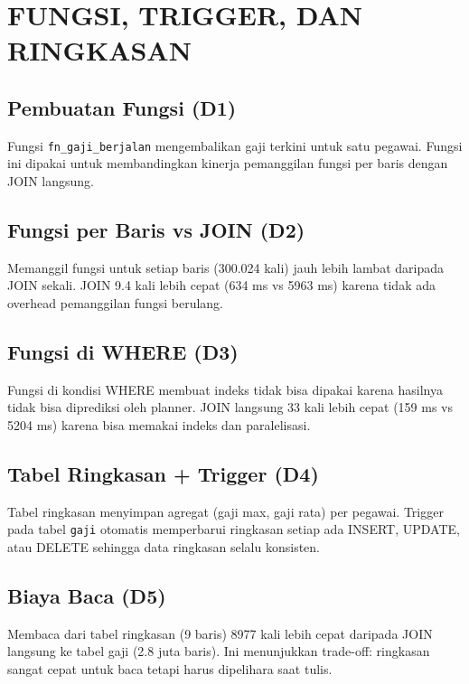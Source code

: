 \chapter{FUNGSI, TRIGGER, DAN RINGKASAN}

\section{Pembuatan Fungsi (D1)}
Fungsi \texttt{fn\_gaji\_berjalan} mengembalikan gaji terkini untuk satu pegawai. Fungsi ini dipakai untuk membandingkan kinerja pemanggilan fungsi per baris dengan JOIN langsung.


\section{Fungsi per Baris vs JOIN (D2)}
Memanggil fungsi untuk setiap baris (300.024 kali) jauh lebih lambat daripada JOIN sekali. JOIN 9.4 kali lebih cepat (634 ms vs 5963 ms) karena tidak ada overhead pemanggilan fungsi berulang.


\section{Fungsi di WHERE (D3)}
Fungsi di kondisi WHERE membuat indeks tidak bisa dipakai karena hasilnya tidak bisa diprediksi oleh planner. JOIN langsung 33 kali lebih cepat (159 ms vs 5204 ms) karena bisa memakai indeks dan paralelisasi.


\section{Tabel Ringkasan + Trigger (D4)}
Tabel ringkasan menyimpan agregat (gaji max, gaji rata) per pegawai. Trigger pada tabel \texttt{gaji} otomatis memperbarui ringkasan setiap ada INSERT, UPDATE, atau DELETE sehingga data ringkasan selalu konsisten.


\section{Biaya Baca (D5)}
Membaca dari tabel ringkasan (9 baris) 8977 kali lebih cepat daripada JOIN langsung ke tabel gaji (2.8 juta baris). Ini menunjukkan trade-off: ringkasan sangat cepat untuk baca tetapi harus dipelihara saat tulis.

